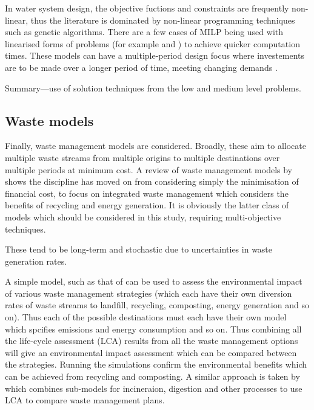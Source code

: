 In water system design, the objective fuctions and constraints are frequently non-linear, thus the literature is dominated by non-linear programming techniques such as genetic algorithms. There are a few cases of MILP being used with linearised forms of problems (for example \citet{Zanganeh2010} and \citet{Lejano2006}) to achieve quicker computation times. These models can have a multiple-period design focus where investements are to be made over a longer period of time, meeting changing demands \citep{Chung2008}.

Summary---use of solution techniques from the low and medium level problems.

\subsection{Waste models}
Finally, waste management models are considered. Broadly, these aim to allocate multiple waste streams from multiple origins to multiple destinations over multiple periods at minimum cost. 
A review of waste management models by \citet{Morrissey2004} shows the discipline has moved on from considering simply the minimisation of financial cost, to focus on integrated waste management which considers the benefits of recycling and energy generation. It is obviously the latter class of models which should be considered in this study, requiring multi-objective techniques.

These tend to be long-term and stochastic due to uncertainties in waste generation rates.

A simple model, such as that of \citet{Bovea2006} can be used to assess the environmental impact of various waste management strategies (which each have their own diversion rates of waste streams to landfill, recycling, composting, energy generation and so on). Thus each of the possible destinations must each have their own model which spcifies emissions and energy consumption and so on. Thus combining all the life-cycle assessment (LCA) results from all the waste management options will give an environmental impact assessment which can be compared between the strategies. Running the simulations confirm the environmental benefits which can be achieved from recycling and composting. A similar approach is taken by \citep{Eriksson2002} which combines sub-models for incineraion, digestion and other processes to use LCA to compare waste management plans.

